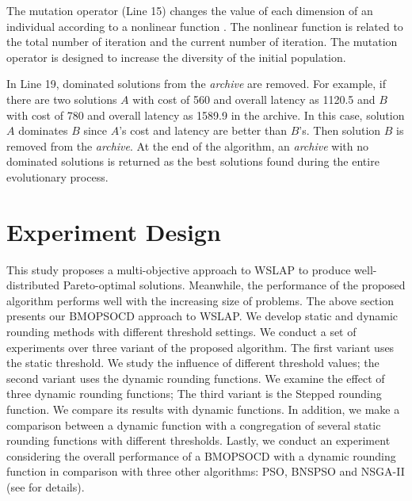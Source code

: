 \documentclass[10pt,journal,compsoc]{IEEEtran}
\begin{document}
The mutation operator (Line 15) changes the value of each dimension of an individual according to a nonlinear function \cite{1304847}. The nonlinear function is related to the total number of iteration and the current number of iteration. The mutation operator is designed to increase the diversity of the initial population.


In Line 19, dominated solutions from the \textit{archive} are removed. For example, if there are two solutions $A$ with cost of 560 and overall latency as 1120.5 and $B$ with cost of 780 and overall latency as 1589.9 in the archive. In this case, solution $A$ dominates $B$ since $A$'s cost and latency are better than $B$'s. Then solution $B$ is removed
from the \textit{archive}. At the end of the algorithm, an \textit{archive} with no dominated
solutions is returned as the best solutions found during the entire evolutionary process.

\section{Experiment Design} \label{sec:experiment}
\label{sec:exp}

This study proposes a multi-objective approach to WSLAP to produce well-distributed Pareto-optimal solutions. Meanwhile, the performance of the proposed algorithm performs well with the increasing size of problems. 
The above section presents our BMOPSOCD approach to WSLAP. We develop static and dynamic rounding methods with different threshold settings. We conduct a set of experiments over three variant of the proposed algorithm. The first variant uses the static threshold. We study the influence of different threshold values; the second variant uses the dynamic rounding functions. We examine the effect of three dynamic rounding functions; The third variant is the Stepped rounding function. We compare its results with dynamic functions. In addition, we make a comparison between a dynamic function with a congregation of
several static rounding functions with different thresholds. 
Lastly, we conduct an experiment considering the overall performance of a BMOPSOCD with a dynamic rounding function in comparison with three other algorithms: PSO, BNSPSO and NSGA-II (see \cite{Tan2016} for details). 
\end{document}
